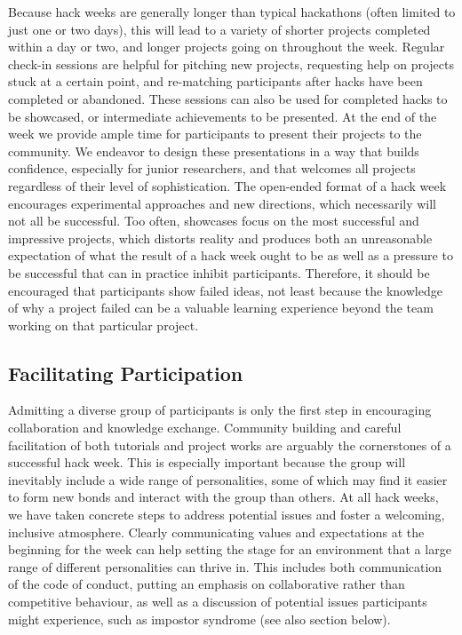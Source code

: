 Because hack weeks are generally longer than typical hackathons (often limited to just one or two days), this will lead to a variety of shorter projects completed within a day or two, and longer projects going on throughout the week. Regular check-in sessions are helpful for pitching new projects, requesting help on projects stuck at a certain point, and re-matching participants after hacks have been completed or abandoned. These sessions can also be used for completed hacks to be showcased, or intermediate achievements to be presented. At the end of the week we provide ample time for participants to present their projects to the community. We endeavor to design these presentations in a way that builds confidence, especially for junior researchers, and that welcomes all projects regardless of their level of sophistication. The open-ended format of a hack week encourages experimental approaches and new directions, which necessarily will not all be successful. Too often, showcases focus on the most successful and impressive projects, which distorts reality and produces both an unreasonable expectation of what the result of a hack week ought to be as well as a pressure to be successful that can in practice inhibit participants. Therefore, it should be encouraged that participants show failed ideas, not least because the knowledge of why a project failed can be a valuable learning experience beyond the team working on that particular project.


\subsection{Facilitating Participation}

Admitting a diverse group of participants is only the first step in encouraging collaboration and knowledge exchange. Community building and careful facilitation of both tutorials and project works are arguably the cornerstones of a successful hack week. This is especially important because the group will inevitably include a wide range of personalities, some of which may find it easier to form new bonds and interact with the group than others. At all hack weeks, we have taken concrete steps to address potential issues and foster a welcoming, inclusive atmosphere. Clearly communicating values and expectations at the beginning for the week can help setting the stage for an environment that a large range of different personalities can thrive in. This includes both communication of the code of conduct, putting an emphasis on collaborative rather than competitive behaviour, as well as a discussion of potential issues participants might experience, such as impostor syndrome (see also section below).

